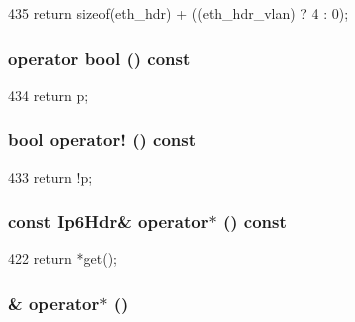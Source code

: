 \begin{DoxyCode}
435 { return sizeof(eth_hdr) + ((eth_hdr_vlan) ? 4 : 0); }
\end{DoxyCode}
\hypertarget{classNet_1_1Ip6Ptr_aa385aa18f5e42db5a415c25a90f4193d}{
\subsubsection[{operator bool}]{\setlength{\rightskip}{0pt plus 5cm}operator bool () const}}
\label{classNet_1_1Ip6Ptr_aa385aa18f5e42db5a415c25a90f4193d}



\begin{DoxyCode}
434 { return p; }
\end{DoxyCode}
\hypertarget{classNet_1_1Ip6Ptr_ac8b1d32dbd52d431450c70b151cfa205}{
\subsubsection[{operator!}]{\setlength{\rightskip}{0pt plus 5cm}bool operator! () const}}
\label{classNet_1_1Ip6Ptr_ac8b1d32dbd52d431450c70b151cfa205}



\begin{DoxyCode}
433 { return !p; }
\end{DoxyCode}
\hypertarget{classNet_1_1Ip6Ptr_a4dae11dfdfaedfdd731ff7caa28e2cd2}{
\subsubsection[{operator$\ast$}]{\setlength{\rightskip}{0pt plus 5cm}const {\bf Ip6Hdr}\& operator$\ast$ () const}}
\label{classNet_1_1Ip6Ptr_a4dae11dfdfaedfdd731ff7caa28e2cd2}



\begin{DoxyCode}
422 { return *get(); }
\end{DoxyCode}
\hypertarget{classNet_1_1Ip6Ptr_a4d4722dfa685e1f6908c1f12384973c4}{
\subsubsection[{operator$\ast$}]{\& operator$\ast$ ()}}
\label{classNet_1_1Ip6Ptr_a4d4722dfa685e1f6908c1f12384973c4}



